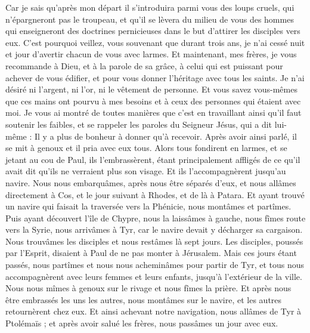 \begin{multicols}{2}
Car je sais qu'après mon départ il s’introduira parmi vous des loups cruels, qui n'épargneront pas le troupeau,
et qu'il se lèvera du milieu de vous des hommes qui enseigneront des doctrines pernicieuses dans le but d'attirer les disciples vers eux.
C'est pourquoi veillez, vous souvenant que durant trois ans, je n'ai cessé nuit et jour d'avertir chacun de vous avec larmes.
Et maintenant, mes frères, je vous recommande à Dieu, et à la parole de sa grâce, à celui qui est puissant pour achever de vous édifier, et pour vous donner l'héritage avec tous les saints.
Je n'ai désiré ni l'argent, ni l'or, ni le vêtement de personne.
Et vous savez vous-mêmes que ces mains ont pourvu à mes besoins et à ceux des personnes qui étaient avec moi.
Je vous ai montré de toutes manières que c’est en travaillant ainsi qu’il faut soutenir les faibles, et se rappeler les paroles du Seigneur Jésus, qui a dit lui-même : Il y a plus de bonheur à donner qu’à recevoir.
Après avoir ainsi parlé, il se mit à genoux et il pria avec eux tous.
Alors tous fondirent en larmes, et se jetant au cou de Paul,
ils l’embrassèrent, étant principalement affligés de ce qu’il avait dit qu’ils ne verraient plus son visage. Et ils l’accompagnèrent jusqu’au navire.
\VerseOne{}Nous nous embarquâmes, après nous être séparés d’eux, et nous allâmes directement à Cos, et le jour suivant à Rhodes, et de là à Patara.
Et ayant trouvé un navire qui faisait la traversée vers la Phénicie, nous montâmes et partîmes.
Puis ayant découvert l’île de Chypre, nous la laissâmes à gauche, nous fîmes route vers la Syrie, nous arrivâmes à Tyr, car le navire devait y décharger sa cargaison.
Nous trouvâmes les disciples et nous restâmes là sept jours. Les disciples, poussés par l'Esprit, disaient à Paul de ne pas monter à Jérusalem.
Mais ces jours étant passés, nous partîmes et nous nous acheminâmes pour partir de Tyr, et tous nous accompagnèrent avec leurs femmes et leurs enfants, jusqu’à l’extérieur de la ville. Nous nous mîmes à genoux sur le rivage et nous fîmes la prière.
Et après nous être embrassés les uns les autres, nous montâmes sur le navire, et les autres retournèrent chez eux.
Et ainsi achevant notre navigation, nous allâmes de Tyr à Ptolémaïs ; et après avoir salué les frères, nous passâmes un jour avec eux.

\end{multicols}
